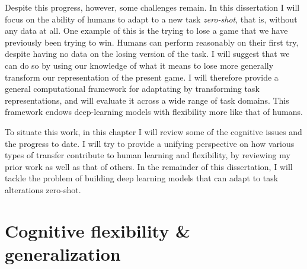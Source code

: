 Despite this progress, however, some challenges remain. In this dissertation I will focus on the ability of humans to adapt to a new task \emph{zero-shot}, that is, without any data at all. One example of this is the trying to lose a game that we have previously been trying to win. Humans can perform reasonably on their first try, despite having no data on the losing version of the task. I will suggest that we can do so by using our knowledge of what it means to lose more generally transform our representation of the present game. I will therefore provide a general computational framework for adaptating by transforming task representations, and will evaluate it across a wide range of task domains. This framework endows deep-learning models with flexibility more like that of humans. \par 
To situate this work, in this chapter I will review some of the cognitive issues and the progress to date. I will try to provide a unifying perspective on how various types of transfer contribute to human learning and flexibility, by reviewing my prior work as well as that of others. In the remainder of this dissertation, I will tackle the problem of building deep learning models that can adapt to task alterations zero-shot. \par 

\section{Cognitive flexibility \& generalization}


